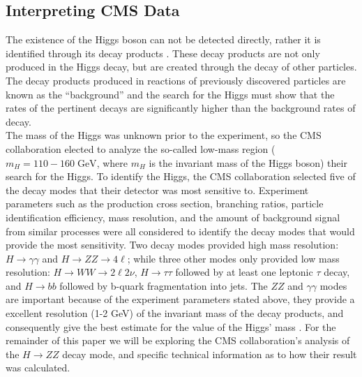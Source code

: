 \documentclass[12pt]{article}
\newcommand{\npar}{\\[0.5cm] \noindent}
\begin{document}
\subsection{Interpreting CMS Data}
The existence of the Higgs boson can not be detected directly, rather it is identified through its decay products \cite{higgs_search}. These decay products are not only produced in the Higgs decay, but are created through the decay of other particles. The decay products produced in reactions of previously discovered particles are known as the ``background'' and the search for the Higgs must show that the rates of the pertinent decays are significantly higher than the background rates of decay.
\npar
 The mass of the Higgs was unknown prior to the experiment, so the CMS collaboration elected to analyze the so-called low-mass region ($m_H = 110-160 \; \text{GeV}$, where $m_H$ is the invariant mass of the Higgs boson) their search for the Higgs. To identify the Higgs, the CMS collaboration selected five of the decay modes that their detector was most sensitive to. Experiment parameters such as the production cross section, branching ratios, particle identification efficiency, mass resolution, and the amount of background signal from similar processes were all considered to identify the decay modes that would provide the most sensitivity. Two decay modes provided high mass resolution: $H\rightarrow \gamma \gamma$ and $H \rightarrow ZZ \rightarrow 4\ell$; while three other modes only provided low mass resolution: $H \rightarrow WW \rightarrow 2\ell2\nu$, $H \rightarrow \tau \tau$ followed by at least one leptonic $\tau$ decay, and $H \rightarrow bb$ followed by b-quark fragmentation into jets. The $ZZ$ and $\gamma \gamma$ modes are important because of the experiment parameters stated above, they provide a excellent resolution (1-2 GeV) of the invariant mass of the decay products, and consequently give the best estimate for the value of the Higgs' mass \cite{new_higgs}. For the remainder of this paper we will be exploring the CMS collaboration's analysis of the $H \to ZZ$ decay mode, and specific technical information as to how their result was calculated.
\end{document}
